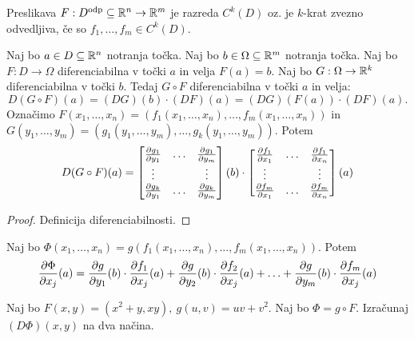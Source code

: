 \begin{opomba}
    Preslikava $F: D^{\text{odp}} \subseteq \mathbb{R}^n \to \mathbb{R}^m$ je razreda $C^k(D)$ oz. je $k$-krat zvezno odvedljiva, če so $f_1, \ldots, f_m \in C^k(D)$.
\end{opomba}

\begin{izrek}
    Naj bo $a \in D \subseteq \mathbb{R}^n$ notranja točka. Naj bo $b \in \Omega \subseteq \mathbb{R}^m$ notranja točka. Naj bo $F: D \to \Omega$ diferenciabilna v točki $a$ in velja $F(a) = b$. Naj bo $G: \Omega \to \mathbb{R}^k$ diferenciabilna v točki $b$. Tedaj $G \circ F$ diferenciabilna v točki $a$ in velja:
    $$D(G \circ F)(a) = (DG)(b) \cdot (DF)(a) = (DG)(F(a)) \cdot (DF)(a).$$
    Označimo $F(x_1, \ldots, x_n) = (f_1(x_1, \ldots, x_n), \ldots, f_m(x_1, \ldots, x_n))$ in $G(y_1, \ldots, y_m) = (g_1(y_1, \ldots, y_m), \ldots, g_k(y_1, \ldots, y_m))$. Potem 
    $$D(G \circ F)(a) = \begin{bmatrix}
        \frac{\partial g_1}{\partial y_1} & \ldots & \frac{\partial g_1}{\partial y_m} \\
        \vdots & & \vdots \\
        \frac{\partial g_k}{\partial y_1} & \ldots & \frac{\partial g_k}{\partial y_m}
    \end{bmatrix}(b) \cdot \begin{bmatrix}
        \frac{\partial f_1}{\partial x_1} & \ldots & \frac{\partial f_1}{\partial x_n} \\
        \vdots & & \vdots \\
        \frac{\partial f_m}{\partial x_1} & \ldots & \frac{\partial f_m}{\partial x_n}
    \end{bmatrix}(a)$$
\end{izrek}

\begin{proof}
    Definicija diferenciabilnosti.
\end{proof}

\begin{posledica}[$k=1$, $G = g$ funkcija]
    Naj bo $\Phi(x_1, \ldots, x_n) = g(f_1(x_1, \ldots, x_n), \ldots, f_m(x_1, \ldots, x_n))$. Potem 
    $$\frac{\partial \Phi}{\partial x_j}(a) = \frac{\partial g}{\partial y_1}(b) \cdot \frac{\partial f_1}{\partial x_j}(a) + \frac{\partial g}{\partial y_2}(b) \cdot \frac{\partial f_2}{\partial x_j}(a) + \ldots + \frac{\partial g}{\partial y_m}(b) \cdot \frac{\partial f_m}{\partial x_j}(a)$$
\end{posledica}

\begin{zgled}
    Naj bo $F(x,y) = (x^2 + y, xy), \ g(u, v) = uv + v^2$. Naj bo $\Phi = g \circ F$. Izračunaj $(D\Phi)(x,y)$ na dva načina.
\end{zgled}

